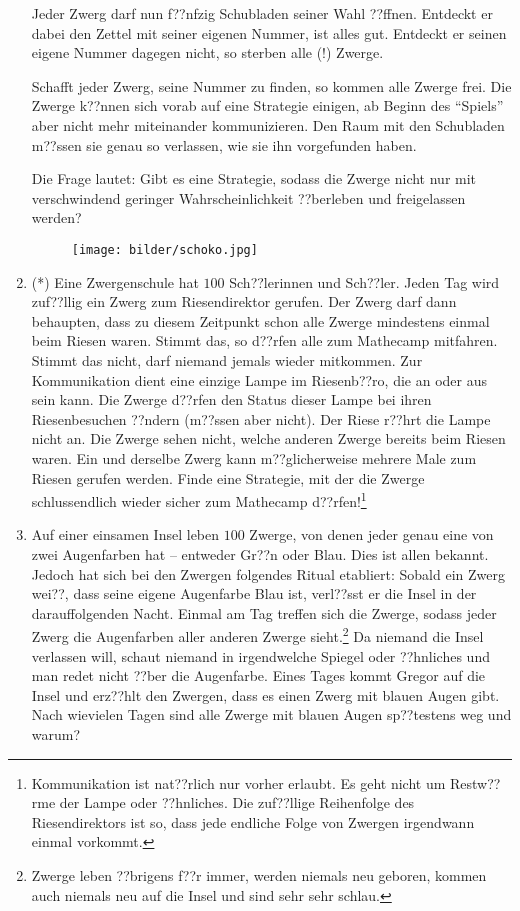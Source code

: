 \documentclass[a4paper,ngerman,12pt]{zirkelblatt1415}
\theoremstyle{definition}
\theoremstyle{plain}
\theoremstyle{remark}
\begin{document}
\begin{enumerate}
Jeder Zwerg darf nun f??nfzig Schubladen seiner Wahl ??ffnen. Entdeckt er dabei den Zettel mit seiner eigenen Nummer, ist alles gut. Entdeckt er seinen eigene Nummer dagegen nicht, so sterben alle (!) Zwerge.

Schafft jeder Zwerg, seine Nummer zu finden, so kommen alle Zwerge frei. Die Zwerge k??nnen sich vorab auf eine Strategie einigen, ab Beginn des "`Spiels"' aber nicht mehr miteinander kommunizieren. Den Raum mit den Schubladen m??ssen sie genau so verlassen, wie sie ihn vorgefunden haben.

Die Frage lautet: Gibt es eine Strategie, sodass die Zwerge nicht nur mit verschwindend geringer Wahrscheinlichkeit ??berleben und freigelassen werden?

\begin{figure}[H]
  \centering
  \texttt{[image: bilder/schoko.jpg]}
\end{figure} 

  \item (*) Eine Zwergenschule hat $100$ Sch??lerinnen und Sch??ler. Jeden Tag wird zuf??llig ein Zwerg zum Riesendirektor gerufen. Der Zwerg darf dann behaupten, dass zu diesem Zeitpunkt schon alle Zwerge mindestens einmal beim Riesen waren. Stimmt das, so d??rfen alle zum Mathecamp mitfahren. Stimmt das nicht, darf niemand jemals wieder mitkommen. Zur Kommunikation dient eine einzige Lampe im Riesenb??ro, die an oder aus sein kann. Die Zwerge d??rfen den Status dieser Lampe bei ihren Riesenbesuchen ??ndern (m??ssen aber nicht). Der Riese r??hrt die Lampe nicht an. Die Zwerge sehen nicht, welche anderen Zwerge bereits beim Riesen waren. Ein und derselbe Zwerg kann m??glicherweise mehrere Male zum Riesen gerufen werden. Finde eine Strategie, mit der die Zwerge schlussendlich wieder sicher zum Mathecamp d??rfen!\footnote{Kommunikation ist nat??rlich nur vorher erlaubt. Es geht nicht um Restw??rme der Lampe oder ??hnliches. Die zuf??llige Reihenfolge des Riesendirektors ist so, dass jede endliche Folge von Zwergen irgendwann einmal vorkommt.}
  \item Auf einer einsamen Insel leben $100$ Zwerge, von denen jeder genau eine von zwei Augenfarben hat -- entweder Gr??n oder Blau. Dies ist allen bekannt. Jedoch hat sich bei den Zwergen folgendes Ritual etabliert: Sobald ein Zwerg wei??, dass seine eigene Augenfarbe Blau ist, verl??sst er die Insel in der darauffolgenden Nacht. Einmal am Tag treffen sich die Zwerge, sodass jeder Zwerg die Augenfarben aller anderen Zwerge sieht.\footnote{Zwerge leben ??brigens f??r immer, werden niemals neu geboren, kommen auch niemals neu auf die Insel und sind sehr sehr schlau.} Da niemand die Insel verlassen will, schaut niemand in irgendwelche Spiegel oder ??hnliches und man redet nicht ??ber die Augenfarbe. Eines Tages kommt Gregor auf die Insel und erz??hlt den Zwergen, dass es einen Zwerg mit blauen Augen gibt. Nach wievielen Tagen sind alle Zwerge mit blauen Augen sp??testens weg und warum?
\end{enumerate}
\end{document}
